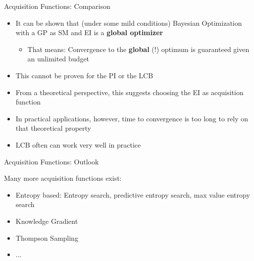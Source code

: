 \documentclass[11pt,compress,t,notes=noshow, xcolor=table]{beamer}
\begin{document}
\begin{vbframe}{Acquisition Functions: Comparison}

\begin{itemize}
  \item It can be shown that (under some mild conditions) Bayesian Optimization with a GP as SM and EI is a \textbf{global optimizer}
  \begin{itemize}
    \item That means: Convergence to the \textbf{global} (!) optimum is guaranteed given an unlimited budget
  \end{itemize}
  \item This cannot be proven for the PI or the LCB
  \item From a theoretical perspective, this suggests choosing the EI as acquisition function
  \item In practical applications, however, time to convergence is too long to rely on that theoretical property
  \item LCB often can work very well in practice
\end{itemize}

\end{vbframe}

\begin{vbframe}{Acquisition Functions: Outlook}

Many more acquisition functions exist:

\begin{itemize}
  \item Entropy based: Entropy search, predictive entropy search, max value entropy search
  \item Knowledge Gradient
  \item Thompson Sampling
  \item ...
\end{itemize}

\end{vbframe}


\endlecture
\end{document}
